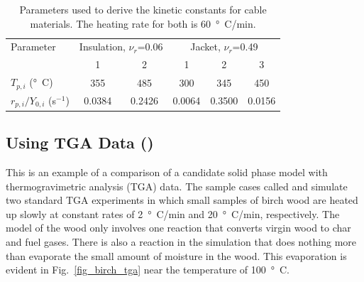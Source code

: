 \documentclass[11pt]{book}
\begin{document}
\begin{table}[ht]
\begin{center}
\caption[Parameters for kinetic constants for cable materials]{Parameters used to derive the kinetic constants for cable materials. The heating rate for both is
60~\si{\degree C}/min.}
\label{cable_parameters}
\begin{tabular}{|l||c|c||c|c|c|}
\hline
Parameter                       & \multicolumn{2}{|c|}{Insulation, $\nu_r$=0.06 }  &  \multicolumn{3}{|c|}{Jacket, $\nu_r$=0.49} \\ \cline{2-6}
                                & 1             & 2                 &  1        & 2         & 3              \\ \hline \hline
$T_{p,i}$ (\si{\degree C})           & 355           & 485               &  300      & 345       & 450            \\ \hline
$r_{p,i}/Y_{0,i}$ (s$^{-1}$)    & 0.0384        & 0.2426            &  0.0064   & 0.3500    & 0.0156         \\ \hline
\end{tabular}
\end{center}
\end{table}


\subsection{Using TGA Data (\texorpdfstring{}{birch\_tga})}
\label{birch_tga}

This is an example of a comparison of a candidate solid phase model with thermogravimetric analysis (TGA) data. The sample cases
called  and  simulate two standard TGA experiments in which small samples of birch wood are heated up slowly at constant
rates of 2~\si{\degree C}/min and 20~\si{\degree C}/min, respectively. The model of the wood only involves one reaction that converts virgin wood to char and fuel gases. There is
also a reaction in the simulation that does nothing more than evaporate the small amount of moisture in the wood. This evaporation is evident in
Fig.~\ref{fig_birch_tga} near the temperature of 100~\si{\degree C}.
\end{document}
